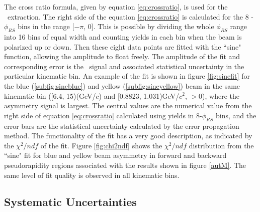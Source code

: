 The cross ratio formula, given by equation \ref{eq:crossratio}, is used for the \aut\ extraction. The right side of the equation \ref{eq:crossratio} is calculated for the 8 - $\phi_{RS}$ bins in the range [$-\pi$, 0]. This is possible by dividing the whole $\phi_{RS}$ range into 16 bins of equal width  and counting yields in each bin when the beam is polarized up or down. Then these eight data points are fitted with the ``sine" function, allowing the amplitude to float freely. The amplitude of the fit and corresponding error is the \aut\ signal and associated statistical uncertainty in the particular kinematic bin. An example of the fit is shown in figure \ref{fig:sinefit} for the blue (\ref{subfig:sineblue}) and yellow (\ref{subfig:sineyellow}) beam in the same kinematic bin (\ptp[6.4, 15)(GeV/$c$) and \minv[0.8823, 1.031)GeV/$c^2$, \etap $>0$), where the asymmetry signal is largest. The central values are the numerical value from the right side of equation \ref{eq:crossratio} calculated using yields in 8-$\phi_{RS}$ bins, and the error bars are the statistical uncertainty calculated by the error propagation method. The functionality of the fit has a very good description, as indicated by the $\chi^2/ndf$ of the fit. Figure \ref{fig:chi2ndf} shows the $\chi^2/ndf$ distribution from the ``sine" fit for blue and yellow beam asymmetry in forward and backward pseudorapidity regions associated with the results shown in figure \ref{autM}. The same level of fit quality is observed in all kinematic bins.    
 
\subsection{Systematic Uncertainties}
